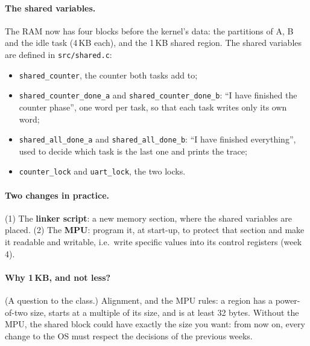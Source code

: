 \paragraph{The shared variables.} The RAM now has four blocks before the kernel's data: the partitions of A, B and the idle task (4\,KB each), and the 1\,KB shared region. The shared variables are defined in \texttt{src/shared.c}:
\begin{itemize}
    \item \texttt{shared\_counter}, the counter both tasks add to;
    \item \texttt{shared\_counter\_done\_a} and \texttt{shared\_counter\_done\_b}: ``I have finished the counter phase'', one word per task, so that each task writes only its own word;
    \item \texttt{shared\_all\_done\_a} and \texttt{shared\_all\_done\_b}: ``I have finished everything'', used to decide which task is the last one and prints the trace;
    \item \texttt{counter\_lock} and \texttt{uart\_lock}, the two locks.
\end{itemize}

\paragraph{Two changes in practice.} (1) The \textbf{linker script}: a new memory section, where the shared variables are placed. (2) The \textbf{MPU}: program it, at start-up, to protect that section and make it readable and writable, i.e.\ write specific values into its control registers (week 4).

\paragraph{Why 1\,KB, and not less?} (A question to the class.) Alignment, and the MPU rules: a region has a power-of-two size, starts at a multiple of its size, and is at least 32 bytes. Without the MPU, the shared block could have exactly the size you want: from now on, every change to the OS must respect the decisions of the previous weeks.

